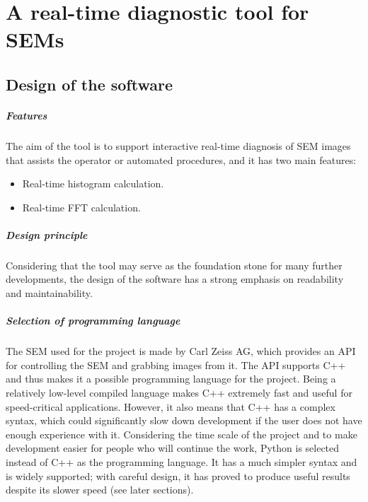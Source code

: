 \documentclass[12pt, twocolumn]{report}
\begin{document}
\chapter{A real-time diagnostic tool for SEMs}
\section{Design of the software}
\paragraph{Features}
The aim of the tool is to support interactive real-time diagnosis of SEM images that assists the operator or automated procedures, and it has two main features:
\begin{itemize}
    \item Real-time histogram calculation.
    \item Real-time FFT calculation.
\end{itemize}

\paragraph{Design principle}
Considering that the tool may serve as the foundation stone for many further developments, the design of the software has a strong emphasis on readability and maintainability.

\paragraph{Selection of programming language}
The SEM used for the project is made by Carl Zeiss AG, which provides an API for controlling the SEM and grabbing images from it. The API supports C++ and thus makes it a possible programming language for the project. Being a relatively low-level compiled language makes C++ extremely fast and useful for speed-critical applications. However, it also means that C++ has a complex syntax, which could significantly slow down development if the user does not have enough experience with it. Considering the time scale of the project and to make development easier for people who will continue the work, Python is selected instead of C++ as the programming language. It has a much simpler syntax and is widely supported; with careful design, it has proved to produce useful results despite its slower speed (see later sections).
\end{document}
